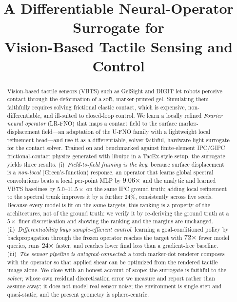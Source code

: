 \documentclass[conference]{IEEEtran}
\newcommand{\baselineSpanLo}{5.0}   \newcommand{\baselineSpanHi}{11.5}
\newcommand{\refineGain}{24}    %
\begin{document}
\title{A Differentiable Neural-Operator Surrogate for\\
Vision-Based Tactile Sensing and Control}

\author{}

\maketitle

\begin{abstract}
Vision-based tactile sensors (VBTS) such as GelSight and DIGIT let robots perceive
contact through the deformation of a soft, marker-printed gel. Simulating them
faithfully requires solving frictional elastic contact, which is expensive,
non-differentiable, and ill-suited to closed-loop control. We learn a
locally refined \emph{Fourier neural operator} (LR-FNO) that maps a contact
field to the surface marker-displacement field---an adaptation of the U-FNO
family with a lightweight local refinement head---and use it as a
differentiable,
solver-faithful, hardware-light surrogate for the contact solver. Trained on and
benchmarked against finite-element IPC/GIPC frictional-contact physics generated
with libuipc in a TacEx-style setup, the surrogate yields three results.
(i)~\emph{Field-to-field framing
is the key}: because surface displacement is a \emph{non-local} (Green's-function)
response, an operator that learns global spectral convolutions beats a local
per-point MLP by $9.06\times$ and the analytic and learned VBTS baselines by
$\baselineSpanLo$--$\baselineSpanHi\times$ on the same IPC ground truth; adding
local refinement to the spectral trunk improves it by a further $\refineGain\%$,
consistently across five seeds. Because every model is fit on the same targets,
this ranking is a property of the architectures, not of the ground truth: we
verify it by re-deriving the ground truth at a $5\times$ finer discretisation and
showing the ranking and the margins are unchanged.
(ii)~\emph{Differentiability buys
sample-efficient control}: learning a goal-conditioned policy by backpropagation
through the frozen operator reaches the target with $72\times$ fewer model
queries, runs $24\times$ faster, and reaches lower final loss than a
gradient-free baseline. (iii)~\emph{The sensor pipeline is autograd-connected}: a
torch marker-dot renderer composes with the operator so that applied shear can be
optimized from the rendered tactile image alone. We close with an honest account
of scope: the surrogate is faithful to the \emph{solver}, whose own residual
discretisation error we measure and report rather than assume away; it does not
model real sensor noise; the environment is single-step and quasi-static; and the
present geometry is sphere-centric.
\end{abstract}
\end{document}
